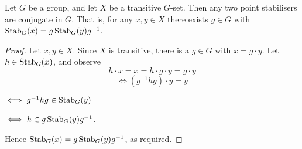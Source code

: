 \begin{theorem}
  Let $G$ be a group, and let $X$ be a transitive $G$-set. Then any two point stabilisers are
  conjugate in $G$. That is, for any $x,y\in X$ there exists $g\in G$ with
  $\operatorname*{Stab}_G(x)=g\operatorname*{Stab}_G(y)g^{-1}$.
  \label{conjugatestab}
\end{theorem}
\begin{proof}
  Let $x,y \in X$. Since $X$ is transitive, there is a $g\in G$ with $x=g \cdot y$. Let $h\in\operatorname*{Stab}_G(x)$, and
  observe
  \[h \cdot x=x=h\cdot g\cdot y=g\cdot y\]
  \[\iff (g^{-1}hg)\cdot y = y\]
  \begin{center}
      $\iff g^{-1}hg\in\operatorname*{Stab}_G(y)$
  \end{center}
  \begin{center}
      $\iff h\in g\operatorname*{Stab}_G(y)g^{-1}$.
  \end{center}
  Hence $\operatorname*{Stab}_G(x)=g\operatorname*{Stab}_G(y)g^{-1}$, as required.
\end{proof}

